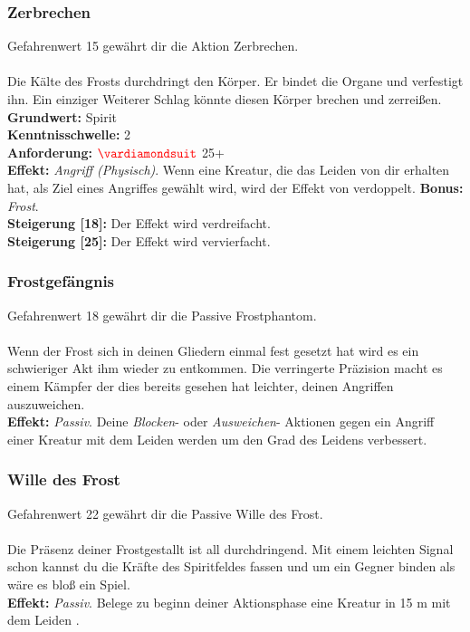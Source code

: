 \subsubsection*{ Zerbrechen} \label{sk:zerbrechen}
Gefahrenwert 15 gewährt dir die Aktion Zerbrechen.\\
\\
Die Kälte des Frosts durchdringt den Körper. Er bindet die Organe und verfestigt ihn. Ein einziger Weiterer Schlag könnte diesen Körper brechen und zerreißen. \\
\textbf{Grundwert:} Spirit \\
\textbf{Kenntnisschwelle:} 2 \\
\textbf{Anforderung:} $\Karo{}$ 25+ \\
\textbf{Effekt:} \textit{Angriff (Physisch)}. Wenn eine Kreatur, die das Leiden  von dir erhalten hat, als Ziel eines Angriffes gewählt wird, wird der Effekt von  verdoppelt. \textbf{Bonus:} \textit{ Frost}.\\
\textbf{Steigerung [18]:} Der  Effekt wird verdreifacht.\\
\textbf{Steigerung [25]:} Der  Effekt wird vervierfacht.\\

\subsubsection*{ Frostgefängnis} \label{sk:frostphantom}
Gefahrenwert 18 gewährt dir die Passive Frostphantom.\\
\\
Wenn der Frost sich in deinen Gliedern einmal fest gesetzt hat wird es ein schwieriger Akt ihm wieder zu entkommen. Die verringerte Präzision macht es einem Kämpfer der dies bereits gesehen hat leichter, deinen Angriffen auszuweichen. \\
\textbf{Effekt:} \textit{Passiv}. Deine \textit{Blocken}- oder \textit{Ausweichen}- Aktionen gegen ein Angriff einer Kreatur mit dem Leiden  werden um den Grad des Leidens verbessert.

\subsubsection*{ Wille des Frost} \label{sk:wille_des_frost}
Gefahrenwert 22 gewährt dir die Passive Wille des Frost.\\
\\
Die Präsenz deiner Frostgestallt ist all durchdringend. Mit einem leichten Signal schon kannst du die Kräfte des Spiritfeldes fassen und um ein Gegner binden als wäre es bloß ein Spiel. \\
\textbf{Effekt:} \textit{Passiv}. Belege zu beginn deiner Aktionsphase eine Kreatur in 15 m mit dem Leiden .



